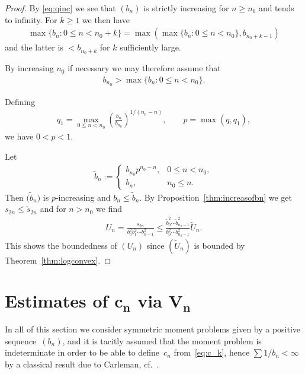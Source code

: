 \documentclass[11pt]{article}
\numberwithin{equation}{section}
\begin{document}
\begin{proof} By \eqref{eq:qinc} we see that $(b_n)$ is strictly increasing for $n\ge n_0$ and tends to infinity. For $k\ge 1$ we then have
\begin{gather*}
\max\{b_n\colon 0\le n<n_0+k\}=\max\left(\max\{b_n\colon 0\le n<n_0\}, b_{n_0+k-1}\right)
\end{gather*}
and the latter is $<b_{n_0+k}$ for $k$ sufficiently large.

By increasing $n_0$ if necessary we may therefore assume that
\begin{gather*}
b_{n_0}> \max\{b_n\colon 0\le n<n_0\}.
\end{gather*}

Defining
\begin{gather*}
q_1=\max_{0\le n<n_0} \left(\frac{b_n}{b_{n_0}}\right)^{1/(n_0-n)}, \qquad p=\max(q,q_1),
\end{gather*}
we have $0<p<1$.

Let
\begin{gather*}
\tilde{b}_n:=\begin{cases} b_{n_0}p^{n_0-n}, & 0\le n<n_0,\\
b_n, & n_0\le n.
\end{cases}
\end{gather*}
Then $\big(\tilde{b}_n\big)$ is $p$-increasing and $b_n\le\tilde{b}_n$. By Proposition~\ref{thm:increasofbn} we get $s_{2n}\le\tilde{s}_{2n}$ and for $n >n_0$ we find
\begin{gather*}
U_n=\frac{s_{2n}}{b_0^2b_1^2\cdots b_{n-1}^2}\le \frac{\tilde{b}_0^2\cdots \tilde{b}_{n_0-1}^2}{b_0^2\cdots b_{n_0-1}^2} \tilde{U}_n.
\end{gather*}
This shows the boundedness of $(U_n)$ since $(\tilde{U}_n)$ is bounded by Theorem~\ref{thm:logconvex}.
\end{proof}

\setcounter{section}{3}
\setcounter{subsection}{0}
\setcounter{subsubsection}{0}
\setcounter{thm}{12}
\setcounter{equation}{33}
\section[Estimates of $c_n$ via $V_n$]{Estimates of $\boldsymbol{c_n}$ via $\boldsymbol{V_n}$}\label{section4}

In all of this section we consider symmetric moment problems given by a positive sequence~$(b_n)$, and it is tacitly assumed that the moment problem is indeterminate in order to be able to define~$c_n$ from~\eqref{eq:c_k}, hence $\sum 1/b_n<\infty$ by a classical result due to Carleman, cf.~\cite[p.~24]{Ak}.
\end{document}
